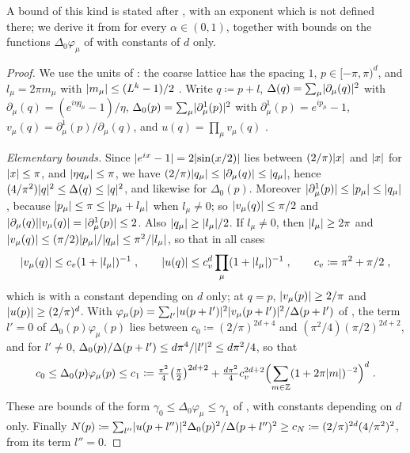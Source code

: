 \documentclass[11pt]{preprint}
\DeclarePairedDelimiter{\abs}{\lvert}{\rvert}
\numberwithin{equation}{section}
\theoremstyle{definition}
\theoremstyle{remark}
\theoremstyle{plain}
\begin{document}
A bound of this kind is stated after \cite[(1.63), p.~28]{BalabanPRT1}, with an exponent which is not defined there; we derive it from \cite[(1.63)]{BalabanPRT1} for every $\alpha \in (0, 1)$, together with bounds on the functions $\Delta_0\varphi_\mu$ of \cite[(1.62)]{BalabanPRT1} with constants of $d$ only.

\begin{proof}
We use the units of \cite{BalabanPRT1}: the coarse lattice has the spacing $1$, $p \in [-\pi, \pi)^d$, and $l_\mu = 2\pi m_\mu$ with $\abs{m_\mu} \leq (L^k - 1)/2$ \cite[p.~23]{BalabanPRT1}. Write $q \coloneqq p + l$, $\Delta(q) = \sum_\mu\abs{\partial_\mu(q)}^2$ with $\partial_\mu(q) = (e^{i\eta q_\mu} - 1)/\eta$, $\Delta_0(p) = \sum_\mu\abs{\partial^1_\mu(p)}^2$ with $\partial^1_\mu(p) = e^{ip_\mu} - 1$, $v_\mu(q) = \partial^1_\mu(p)/\partial_\mu(q)$, and $u(q) = \prod_\mu v_\mu(q)$ \cite[(1.31), (1.61), p.~24]{BalabanPRT1}.

\emph{Elementary bounds.} Since $\abs{e^{ix} - 1} = 2\abs{\sin(x/2)}$ lies between $(2/\pi)\abs{x}$ and $\abs{x}$ for $\abs{x} \leq \pi$, and $\abs{\eta q_\mu} \leq \pi$, we have $(2/\pi)\abs{q_\mu} \leq \abs{\partial_\mu(q)} \leq \abs{q_\mu}$, hence $(4/\pi^2)\abs{q}^2 \leq \Delta(q) \leq \abs{q}^2$, and likewise for $\Delta_0(p)$. Moreover $\abs{\partial^1_\mu(p)} \leq \abs{p_\mu} \leq \abs{q_\mu}$, because $\abs{p_\mu} \leq \pi \leq \abs{p_\mu + l_\mu}$ when $l_\mu \neq 0$; so $\abs{v_\mu(q)} \leq \pi/2$ and $\abs{\partial_\mu(q)}\abs{v_\mu(q)} = \abs{\partial^1_\mu(p)} \leq 2$. Also $\abs{q_\mu} \geq \abs{l_\mu}/2$. If $l_\mu \neq 0$, then $\abs{l_\mu} \geq 2\pi$ and $\abs{v_\mu(q)} \leq (\pi/2)\abs{p_\mu}/\abs{q_\mu} \leq \pi^2/\abs{l_\mu}$, so that in all cases
\begin{equation}\label{eq:alias-decay}
    \abs{v_\mu(q)} \leq c_v(1 + \abs{l_\mu})^{-1}\;,
    \qquad
    \abs{u(q)} \leq c_v^d\prod_\mu(1 + \abs{l_\mu})^{-1}\;,
    \qquad
    c_v \coloneqq \pi^2 + \pi/2\;,
\end{equation}
which is \cite[(1.36), p.~24]{BalabanPRT1} with a constant depending on $d$ only; at $q = p$, $\abs{v_\mu(p)} \geq 2/\pi$ and $\abs{u(p)} \geq (2/\pi)^d$. With $\varphi_\mu(p) = \sum_{l'}\abs{u(p + l')}^2\abs{v_\mu(p + l')}^2/\Delta(p + l')$ of \cite[(1.62)]{BalabanPRT1}, the term $l' = 0$ of $\Delta_0(p)\varphi_\mu(p)$ lies between $c_0 \coloneqq (2/\pi)^{2d+4}$ and $(\pi^2/4)(\pi/2)^{2d+2}$, and for $l' \neq 0$, $\Delta_0(p)/\Delta(p + l') \leq d\pi^4/\abs{l'}^2 \leq d\pi^2/4$, so that
\begin{equation}\label{eq:phi-bounds}
    c_0 \leq \Delta_0(p)\varphi_\mu(p) \leq c_1 \coloneqq \tfrac{\pi^2}{4}\bigl(\tfrac{\pi}{2}\bigr)^{2d+2} + \tfrac{d\pi^2}{4}c_v^{2d+2}\Bigl(\sum_{m \in \mathbb Z}(1 + 2\pi\abs{m})^{-2}\Bigr)^d\;.
\end{equation}
These are bounds of the form $\gamma_0 \leq \Delta_0\varphi_\mu \leq \gamma_1$ of \cite[p.~28]{BalabanPRT1}, with constants depending on $d$ only. Finally $N(p) \coloneqq \sum_{l''}\abs{u(p + l'')}^2\Delta_0(p)^2/\Delta(p + l'')^2 \geq c_N \coloneqq (2/\pi)^{2d}(4/\pi^2)^2$, from its term $l'' = 0$.


\end{proof}
\end{document}
